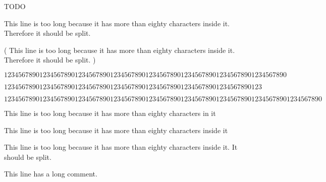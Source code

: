 TODO

This line is too long because it has more than eighty characters inside it. Therefore it should be split.

(
This line is too long because it has more than eighty characters inside it. Therefore it should be split.
)

\begin{equation}
1234567890 1234567890 1234567890 1234567890 1234567890 1234567890 1234567890 1234567890
\end{equation}

\begin{equation}
1234567890 1234567890 1234567890 1234567890 1234567890 1234567890 1234567890 123
\end{equation}

\begin{equation}
123456789012345678901234567890123456789012345678901234567890123456789012345678901234567890
\end{equation}

This line is too long because it has more than eighty characters in it %

This line is too long because it has more than eighty characters inside it %

This line is too long because it has more than eighty characters inside it. It should be split. %

This line has a long comment. %

